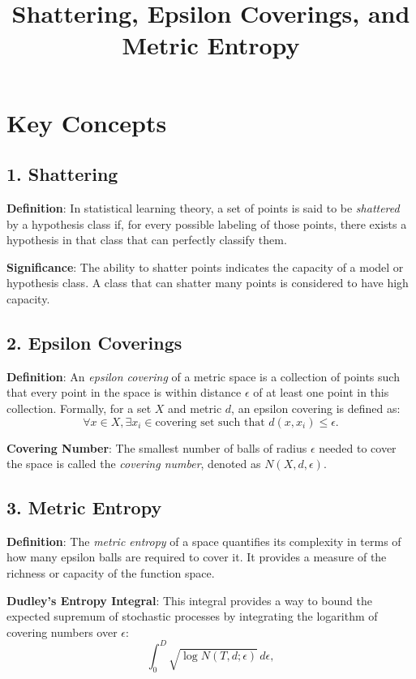\documentclass{article}
\title{Shattering, Epsilon Coverings, and Metric Entropy}
\author{}
\date{}
\begin{document}
\maketitle

\section{Key Concepts}

\subsection{1. Shattering}
\textbf{Definition}: In statistical learning theory, a set of points is said to be \textit{shattered} by a hypothesis class if, for every possible labeling of those points, there exists a hypothesis in that class that can perfectly classify them.

\textbf{Significance}: The ability to shatter points indicates the capacity of a model or hypothesis class. A class that can shatter many points is considered to have high capacity.

\subsection{2. Epsilon Coverings}
\textbf{Definition}: An \textit{epsilon covering} of a metric space is a collection of points such that every point in the space is within distance $\epsilon$ of at least one point in this collection. Formally, for a set $X$ and metric $d$, an epsilon covering is defined as:
$$
\forall x \in X, \exists x_i \in \text{covering set} \text{ such that } d(x, x_i) \leq \epsilon.
$$


\textbf{Covering Number}: The smallest number of balls of radius $\epsilon$ needed to cover the space is called the \textit{covering number}, denoted as $N(X, d, \epsilon)$.

\subsection{3. Metric Entropy}
\textbf{Definition}: The \textit{metric entropy} of a space quantifies its complexity in terms of how many epsilon balls are required to cover it. It provides a measure of the richness or capacity of the function space.

\textbf{Dudley’s Entropy Integral}: This integral provides a way to bound the expected supremum of stochastic processes by integrating the logarithm of covering numbers over $\epsilon$:
$$
\int_0^{D} \sqrt{\log N(T, d; \epsilon)} \, d\epsilon,
$$
\end{document}
